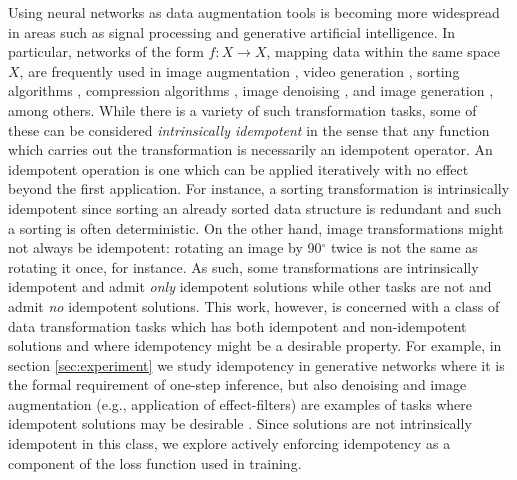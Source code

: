 \documentclass{article}
\theoremstyle{plain}
\theoremstyle{definition}
\theoremstyle{remark}
\begin{document}
Using neural networks as data augmentation tools is becoming more widespread in areas such as signal processing and generative artificial intelligence. In particular, networks of the form ${f: X \to X}$, mapping data within the same space $X$, are frequently used in image augmentation \cite{lu-image-aug}, video generation \cite{ma-compression, liu-gans}, sorting algorithms \cite{tambouratzis-sorting}, compression algorithms \cite{namphol-compression, liu-gans}, image denoising \cite{mao-deblurring, ilesanmi-denoising, liu-gans}, and image generation \cite{liu-gans}, among others. While there is a variety of such transformation tasks, some of these can be considered \textit{intrinsically idempotent} in the sense that any function which carries out the transformation is necessarily an idempotent operator. An idempotent operation is one which can be applied iteratively with no effect beyond the first application. For instance, a sorting transformation is intrinsically idempotent since sorting an already sorted data structure is redundant and such a sorting is often deterministic. On the other hand, image transformations might not always be idempotent: rotating an image by 90$^{\circ}$ twice is not the same as rotating it once, for instance. As such, some transformations are intrinsically idempotent and admit \textit{only} idempotent solutions while other tasks are not and admit \textit{no} idempotent solutions. This work, however, is concerned with a class of data transformation tasks which has both idempotent and non-idempotent solutions and where idempotency might be a desirable property. For example, in section \ref{sec:experiment} we study idempotency in generative networks where it is the formal requirement of one-step inference, but also denoising and image augmentation (e.g., application of effect-filters) are examples of tasks where idempotent solutions may be desirable \cite{mao-deblurring,liu-gans}. Since solutions are not intrinsically idempotent in this class, we explore actively enforcing idempotency as a component of the loss function used in training.
\end{document}
